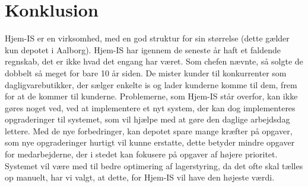 \section{Konklusion}
Hjem-IS er en virksomhed, med en god struktur for sin størrelse (dette gælder kun depotet i Aalborg). Hjem-IS har igennem de seneste år haft et faldende regnskab, det er ikke hvad det engang har været. Som chefen nævnte, så solgte de dobbelt så meget for bare 10 år siden. De mister kunder til konkurrenter som dagligvarebutikker, der sælger enkelte is og lader kunderne komme til dem, frem for at de kommer til kunderne. Problemerne, som Hjem-IS står overfor, kan ikke gøres noget ved, ved at implementere et nyt system, der kan dog implementeres opgraderinger til systemet, som vil hjælpe med at gøre den daglige arbejdsdag lettere. Med de nye forbedringer, kan depotet spare mange kræfter på opgaver, som nye opgraderinger hurtigt vil kunne erstatte, dette betyder mindre opgaver for medarbejderne, der i stedet kan fokusere på opgaver af højere prioritet. Systemet vil være med til bedre optimering af lagerstyring, da det ofte skal tælles op manuelt, har vi valgt, at dette, for Hjem-IS vil have den højeste værdi. 